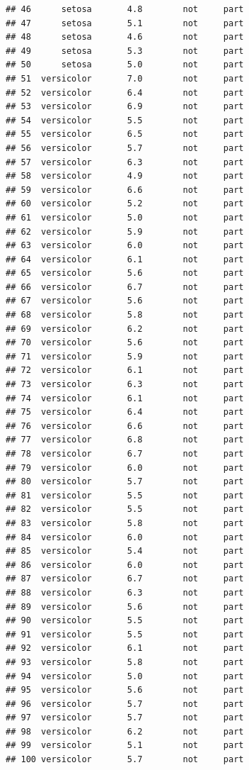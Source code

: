 \documentclass[krantz2]{krantz}\usepackage{knitr}%
\begin{document}
\begin{knitrout}
\begin{kframe}
\begin{verbatim}
## 46      setosa       4.8        not     part
## 47      setosa       5.1        not     part
## 48      setosa       4.6        not     part
## 49      setosa       5.3        not     part
## 50      setosa       5.0        not     part
## 51  versicolor       7.0        not     part
## 52  versicolor       6.4        not     part
## 53  versicolor       6.9        not     part
## 54  versicolor       5.5        not     part
## 55  versicolor       6.5        not     part
## 56  versicolor       5.7        not     part
## 57  versicolor       6.3        not     part
## 58  versicolor       4.9        not     part
## 59  versicolor       6.6        not     part
## 60  versicolor       5.2        not     part
## 61  versicolor       5.0        not     part
## 62  versicolor       5.9        not     part
## 63  versicolor       6.0        not     part
## 64  versicolor       6.1        not     part
## 65  versicolor       5.6        not     part
## 66  versicolor       6.7        not     part
## 67  versicolor       5.6        not     part
## 68  versicolor       5.8        not     part
## 69  versicolor       6.2        not     part
## 70  versicolor       5.6        not     part
## 71  versicolor       5.9        not     part
## 72  versicolor       6.1        not     part
## 73  versicolor       6.3        not     part
## 74  versicolor       6.1        not     part
## 75  versicolor       6.4        not     part
## 76  versicolor       6.6        not     part
## 77  versicolor       6.8        not     part
## 78  versicolor       6.7        not     part
## 79  versicolor       6.0        not     part
## 80  versicolor       5.7        not     part
## 81  versicolor       5.5        not     part
## 82  versicolor       5.5        not     part
## 83  versicolor       5.8        not     part
## 84  versicolor       6.0        not     part
## 85  versicolor       5.4        not     part
## 86  versicolor       6.0        not     part
## 87  versicolor       6.7        not     part
## 88  versicolor       6.3        not     part
## 89  versicolor       5.6        not     part
## 90  versicolor       5.5        not     part
## 91  versicolor       5.5        not     part
## 92  versicolor       6.1        not     part
## 93  versicolor       5.8        not     part
## 94  versicolor       5.0        not     part
## 95  versicolor       5.6        not     part
## 96  versicolor       5.7        not     part
## 97  versicolor       5.7        not     part
## 98  versicolor       6.2        not     part
## 99  versicolor       5.1        not     part
## 100 versicolor       5.7        not     part

\end{verbatim}
\end{kframe}
\end{knitrout}
\end{document}
